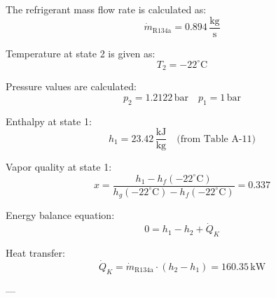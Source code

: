 The refrigerant mass flow rate is calculated as:  
\[
\dot{m}_{\text{R134a}} = 0.894 \, \frac{\text{kg}}{\text{s}}
\]

Temperature at state 2 is given as:  
\[
T_2 = -22^\circ\text{C}
\]

Pressure values are calculated:  
\[
p_2 = 1.2122 \, \text{bar} \quad p_1 = 1 \, \text{bar}
\]

Enthalpy at state 1:  
\[
h_1 = 23.42 \, \frac{\text{kJ}}{\text{kg}} \quad \text{(from Table A-11)}
\]

Vapor quality at state 1:  
\[
x = \frac{h_1 - h_f(-22^\circ\text{C})}{h_g(-22^\circ\text{C}) - h_f(-22^\circ\text{C})} = 0.337
\]

Energy balance equation:  
\[
0 = h_1 - h_2 + \dot{Q}_K
\]

Heat transfer:  
\[
\dot{Q}_K = \dot{m}_{\text{R134a}} \cdot (h_2 - h_1) = 160.35 \, \text{kW}
\]

---